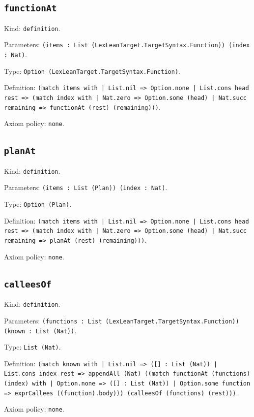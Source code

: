 \documentclass[11pt]{article}
\begin{document}
\subsection*{\texttt{functionAt}}
\noindent Kind: \texttt{definition}.\par
\noindent Parameters: \texttt{(items : List (LexLeanTarget.TargetSyntax.Function)) (index : Nat)}.\par
\noindent Type: \texttt{Option (LexLeanTarget.TargetSyntax.Function)}.\par
\noindent Definition: \texttt{(match items with | List.nil => Option.none | List.cons head rest => (match index with | Nat.zero => Option.some (head) | Nat.succ remaining => functionAt (rest) (remaining)))}.\par
\noindent Axiom policy: \texttt{none}.\par
\subsection*{\texttt{planAt}}
\noindent Kind: \texttt{definition}.\par
\noindent Parameters: \texttt{(items : List (Plan)) (index : Nat)}.\par
\noindent Type: \texttt{Option (Plan)}.\par
\noindent Definition: \texttt{(match items with | List.nil => Option.none | List.cons head rest => (match index with | Nat.zero => Option.some (head) | Nat.succ remaining => planAt (rest) (remaining)))}.\par
\noindent Axiom policy: \texttt{none}.\par
\subsection*{\texttt{calleesOf}}
\noindent Kind: \texttt{definition}.\par
\noindent Parameters: \texttt{(functions : List (LexLeanTarget.TargetSyntax.Function)) (known : List (Nat))}.\par
\noindent Type: \texttt{List (Nat)}.\par
\noindent Definition: \texttt{(match known with | List.nil => ([] : List (Nat)) | List.cons index rest => appendAll (Nat) ((match functionAt (functions) (index) with | Option.none => ([] : List (Nat)) | Option.some function => exprCallees ((function).body))) (calleesOf (functions) (rest)))}.\par
\noindent Axiom policy: \texttt{none}.\par
\end{document}
